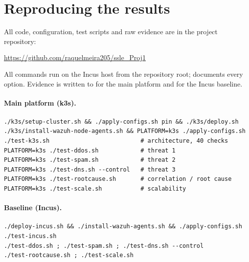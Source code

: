 \section{Reproducing the results}
\label{app:repro}

All code, configuration, test scripts and raw evidence are in the project repository:
\begin{center}\url{https://github.com/raquelmeira205/ssle_Proj1}\end{center}
\noindent All commands run on the Incus host from the repository root;  documents every
option. Evidence is written to  for the main platform and
 for the Incus baseline.

\paragraph{Main platform (k3s).}
\begin{verbatim}
./k3s/setup-cluster.sh && ./apply-configs.sh pin && ./k3s/deploy.sh
./k3s/install-wazuh-node-agents.sh && PLATFORM=k3s ./apply-configs.sh
./test-k3s.sh                          # architecture, 40 checks
PLATFORM=k3s ./test-ddos.sh            # threat 1
PLATFORM=k3s ./test-spam.sh            # threat 2
PLATFORM=k3s ./test-dns.sh --control   # threat 3
PLATFORM=k3s ./test-rootcause.sh       # correlation / root cause
PLATFORM=k3s ./test-scale.sh           # scalability
\end{verbatim}

\paragraph{Baseline (Incus).}
\begin{verbatim}
./deploy-incus.sh && ./install-wazuh-agents.sh && ./apply-configs.sh
./test-incus.sh
./test-ddos.sh ; ./test-spam.sh ; ./test-dns.sh --control
./test-rootcause.sh ; ./test-scale.sh
\end{verbatim}

